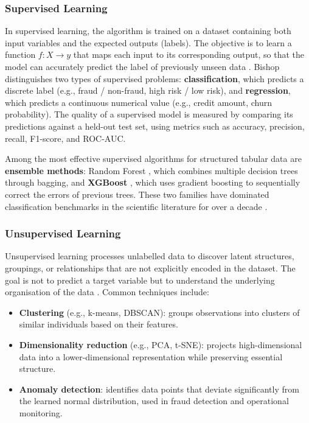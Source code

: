 \subsubsection{Supervised Learning}

In supervised learning, the algorithm is trained on a dataset containing both input
variables and the expected outputs (labels). The objective is to learn a function
$f: X \to y$ that maps each input to its corresponding output, so that the model can
accurately predict the label of previously unseen data \cite{mitchell1997}. Bishop
\cite{bishop2006} distinguishes two types of supervised problems: \textbf{classification},
which predicts a discrete label (e.g., fraud / non-fraud, high risk / low risk), and
\textbf{regression}, which predicts a continuous numerical value (e.g., credit amount, churn
probability). The quality of a supervised model is measured by comparing its predictions
against a held-out test set, using metrics such as accuracy, precision, recall, F1-score,
and ROC-AUC.

Among the most effective supervised algorithms for structured tabular data are
\textbf{ensemble methods}: Random Forest \cite{breiman2001}, which combines multiple
decision trees through bagging, and \textbf{XGBoost} \cite{chen2016}, which uses gradient
boosting to sequentially correct the errors of previous trees. These two families have
dominated classification benchmarks in the scientific literature for over a decade
\cite{lessmann2015, baesens2003}.

\subsubsection{Unsupervised Learning}

Unsupervised learning processes unlabelled data to discover latent structures, groupings,
or relationships that are not explicitly encoded in the dataset. The goal is not to predict
a target variable but to understand the underlying organisation of the data
\cite{hastie2009}. Common techniques include:

\begin{itemize}
    \item \textbf{Clustering} (e.g., k-means, DBSCAN): groups observations into clusters
    of similar individuals based on their features.
    \item \textbf{Dimensionality reduction} (e.g., PCA, t-SNE): projects high-dimensional
    data into a lower-dimensional representation while preserving essential structure.
    \item \textbf{Anomaly detection}: identifies data points that deviate significantly from
    the learned normal distribution, used in fraud detection and operational monitoring.
\end{itemize}


